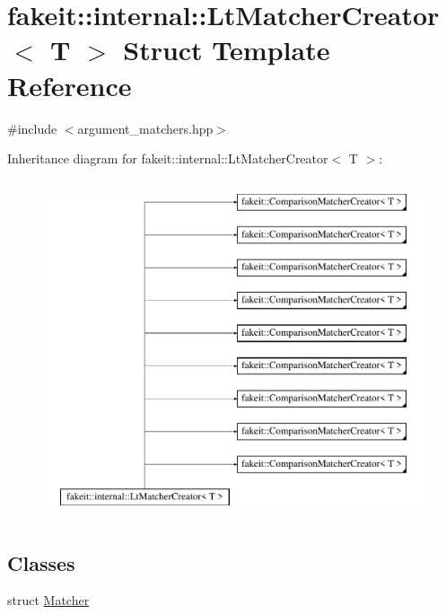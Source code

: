 \hypertarget{structfakeit_1_1internal_1_1LtMatcherCreator}{}\section{fakeit\+::internal\+::Lt\+Matcher\+Creator$<$ T $>$ Struct Template Reference}
\label{structfakeit_1_1internal_1_1LtMatcherCreator}


{\ttfamily \#include $<$argument\+\_\+matchers.\+hpp$>$}

Inheritance diagram for fakeit\+::internal\+::Lt\+Matcher\+Creator$<$ T $>$\+:\begin{figure}[H]
\begin{center}
\leavevmode
\includegraphics[height=10.000000cm]{structfakeit_1_1internal_1_1LtMatcherCreator}
\end{center}
\end{figure}
\subsection*{Classes}
\begin{DoxyCompactItemize}
\item 
struct \mbox{\hyperlink{structfakeit_1_1internal_1_1LtMatcherCreator_1_1Matcher}{Matcher}}
\end{DoxyCompactItemize}
